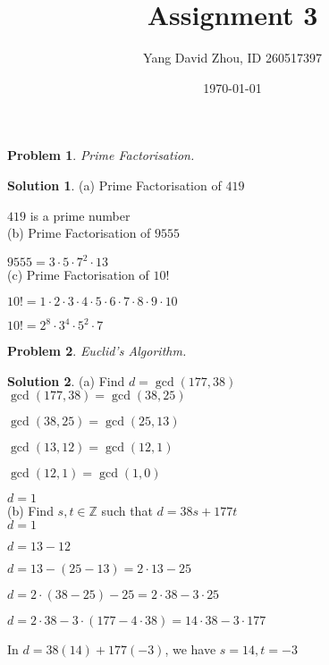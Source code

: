 \documentclass{article}
\newtheorem{problem}{Problem}
\theoremstyle{definition}
\newtheorem*{solution}{Solution}
\begin{document}
 \title{Assignment 3} 

\author{Yang David Zhou, ID 260517397} 

\date{\today}

\maketitle

\begin{problem} 

Prime Factorisation.

\end{problem}

\begin{solution}

(a) Prime Factorisation of \(419\)

\(419\) is a prime number \\

(b) Prime Factorisation of \(9555\)

\(9555=3\cdot 5\cdot 7^2\cdot 13\) \\

(c) Prime Factorisation of \(10!\)

\(10!=1\cdot 2\cdot 3\cdot 4\cdot 5\cdot 6\cdot 7\cdot 8\cdot 9\cdot 10\)

\(10!=2^8\cdot 3^4\cdot 5^2\cdot 7\)

\end{solution}

\begin{problem}

Euclid's Algorithm.

\end{problem}

\begin{solution}

(a) Find \(d=\gcd (177,38)\) \\

\(\gcd (177,38)=\gcd (38,25)\)

\(\gcd (38,25)=\gcd (25,13)\)

\(\gcd (13,12)=\gcd (12,1)\)

\(\gcd (12,1)=\gcd (1,0)\) 

\(d=1\) \\

(b) Find \(s,t\in \mathbb{Z}\) such that \(d=38s+177t\) \\

\(d=1\)

\(d=13-12\)

\(d=13-(25-13)=2\cdot 13-25\)

\(d=2\cdot (38-25)-25=2\cdot 38-3\cdot 25\)

\(d=2\cdot 38-3\cdot (177-4\cdot 38)=14\cdot 38-3\cdot 177\)

In \(d=38(14)+177(-3)\), we have \(s=14,t=-3\)

\end{solution}
\end{document}
